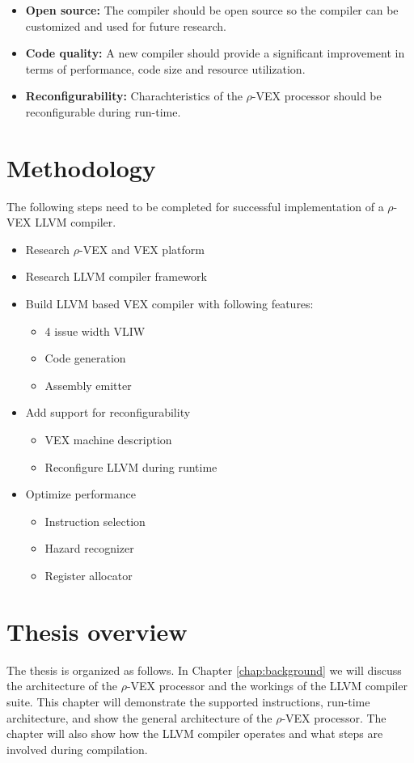 \begin{itemize}
	\item \textbf{Open source:} The compiler should be open source so the compiler can be customized and used for future research.
	\item \textbf{Code quality:} A new compiler should provide a significant improvement in terms of performance, code size and resource utilization.
	\item \textbf{Reconfigurability:} Charachteristics of the $\rho$-VEX processor should be reconfigurable during run-time.
\end{itemize}

\section{Methodology}
The following steps need to be completed for successful implementation of a $\rho$-VEX LLVM compiler.
\begin{itemize}
	\item Research $\rho$-VEX and VEX platform
	\item Research LLVM compiler framework
	\item Build LLVM based VEX compiler with following features:
	\begin{itemize}
		\item 4 issue width VLIW
		\item Code generation
		\item Assembly emitter
	\end{itemize}
	\item Add support for reconfigurability
		\begin{itemize}
			\item VEX machine description
			\item Reconfigure LLVM during runtime
		\end{itemize}	
	\item Optimize performance
	\begin{itemize}
		\item Instruction selection
		\item Hazard recognizer
		\item Register allocator
	\end{itemize}	
\end{itemize}




\section{Thesis overview}
The thesis is organized as follows. 
In Chapter \ref{chap:background} we will discuss the architecture of the $\rho$-VEX processor and the workings of the LLVM compiler suite. This chapter will demonstrate the supported instructions, run-time architecture, and show the general architecture of the $\rho$-VEX processor. The chapter will also show how the LLVM compiler operates and what steps are involved during compilation.


